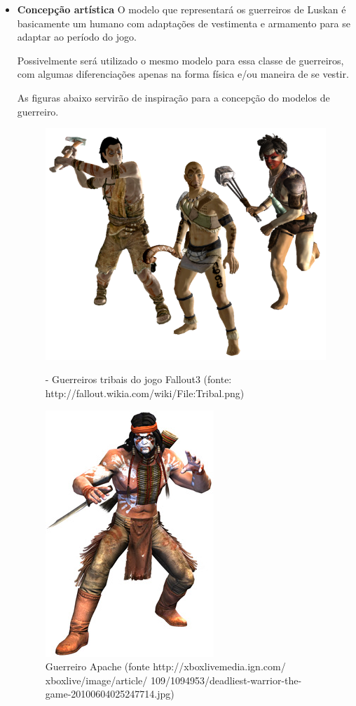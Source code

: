 \begin{itemize}
\item{\bf Concepção artística}
O modelo que representará os guerreiros de Luskan é basicamente um humano com adaptações de vestimenta e armamento para se adaptar ao período do jogo.

Possivelmente será utilizado o mesmo modelo para essa classe de guerreiros, com algumas diferenciações apenas na forma física e/ou maneira de se vestir.

As figuras abaixo servirão de inspiração para a concepção do modelos de guerreiro.
\newpage
 \begin{figure}[H]
 \centering
 \includegraphics[scale=0.5]{Imagens/guerreiro01.png}
 \caption{- Guerreiros tribais do jogo Fallout3 (fonte: http://fallout.wikia.com/wiki/File:Tribal.png)}
\label{img:guerreiro01}
 \centering
 \includegraphics[scale=0.5]{Imagens/guerreiro02.png}
 \caption{Guerreiro Apache (fonte http://xboxlivemedia.ign.com/
 xboxlive/image/article/
 109/1094953/deadliest-warrior-the-game-20100604025247714.jpg)}
\end{figure}
\end{itemize}

